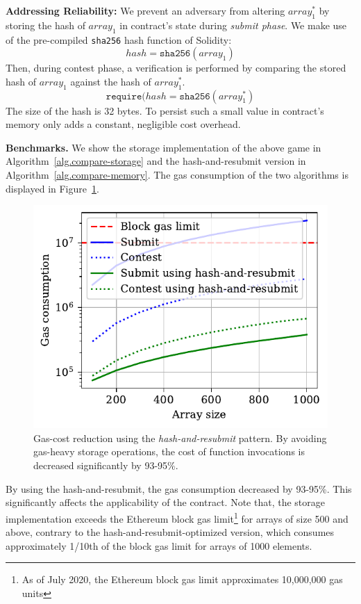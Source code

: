 \noindent \textbf{Addressing Reliability:} We prevent an adversary from
altering $array_1^*$ by storing the hash of $array_1$ in contract's state
during \emph{submit phase}. We make use of the pre-compiled \texttt{sha256}
hash function of Solidity: \[hash = \texttt{sha256}(array_1)\] Then, during
contest phase, a verification is performed by comparing the stored hash of
$array_1$ against the hash of $array_1^*$.  \[\texttt{require}(hash =
\texttt{sha256}(array_1^*)\]
\noindent
The size of the hash is 32 bytes. To persist such a small value in contract's
memory only adds a constant, negligible cost overhead.

\noindent \textbf{Benchmarks.} We show the storage implementation of the
above game in Algorithm~\ref{alg.compare-storage} and the hash-and-resubmit
version in Algorithm~\ref{alg.compare-memory}. The gas consumption of the two
algorithms is displayed in Figure~\ref{fig:har-example}.

\begin{figure}[h!]
\begin{center}
\includegraphics[width=1 \columnwidth]{figures/har-example.pdf}
\end{center}
\caption{Gas-cost reduction using the \emph{hash-and-resubmit} pattern. By
avoiding gas-heavy storage operations, the cost of function invocations is
decreased significantly by 93-95\%.}
\label{fig:har-example}
\end{figure}

By using the hash-and-resubmit, the gas consumption decreased by 93-95\%. This
significantly affects the applicability of the contract. Note that, the storage
implementation exceeds the Ethereum block gas limit\footnote{As of July 2020,
the Ethereum block gas limit approximates 10,000,000 gas units} for arrays of
size 500 and above, contrary to the hash-and-resubmit-optimized version, which
consumes approximately 1/10th of the block gas limit for arrays of 1000
elements.

